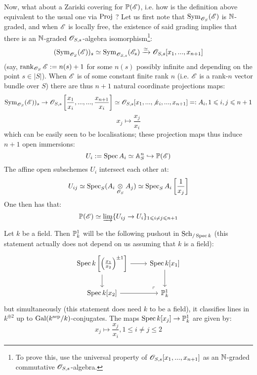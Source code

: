             Now, what about a Zariski covering for $\P(\scrE)$, i.e. how is the definition above equivalent to the usual one via $\Proj$ ? Let us first note that $\Sym_{\scrO_S}(\scrE)$ is $\N$-graded, and when $\scrE$ is locally free, the existence of said grading implies that there is an $\N$-graded $\scrO_{S, s}$-algebra isomorphism\footnote{To prove this, use the universal property of $\scrO_{S, s}[x_1, ..., x_{n + 1}]$ as an $\N$-graded commutative $\scrO_{S, s}$-algebra.}:
                $$(\Sym_{\scrO_S}(\scrE))_s \cong \Sym_{\scrO_{S, s}}(\scrE_s) \xrightarrow[]{\cong} \scrO_{S, s}[x_1, ..., x_{n + 1}]$$
            (say, $\rank_{\scrO_S} \scrE := n(s) + 1$ for some $n(s)$ possibly infinite and depending on the point $s \in |S|$). When $\scrE$ is of some constant finite rank $n$ (i.e. $\scrE$ is a rank-$n$ vector bundle over $S$) there are thus $n + 1$ natural coordinate projections maps:
                $$\Sym_{\scrO_S}(\scrE))_s \to \scrO_{S, s}\left[\frac{x_1}{x_i}, ..., ..., \frac{x_{n + 1}}{x_i}\right] \cong \scrO_{S, s}[x_1, ..., \not{x_i}, ..., x_{n + 1}] =: A_i, 1 \leq i, j \leq n + 1$$
                $$x_j \mapsto \frac{x_j}{x_i}$$
            which can be easily seen to be localisations; these projection maps thus induce $n + 1$ open immersions:
                $$U_i := \Spec A_i \cong \A^n_S \hookrightarrow \P(\scrE)$$
            The affine open subschemes $U_i$ intersect each other at:
                $$U_{ij} \cong \Spec_S ( A_i \tensor_{\scrO_S} A_j ) \cong \Spec_S A_i\left[\frac{1}{x_j}\right]$$
            One then has that:
                $$\P(\scrE) \cong \indlim\{U_{ij} \to U_i\}_{1 \leq i \not = j \leq n + 1}$$
            \begin{example}
                Let $k$ be a field. Then $\P^1_k$ will be the following pushout in $\Sch_{/\Spec k}$ (this statement actually does not depend on us assuming that $k$ is a field):
                    $$
                        \begin{tikzcd}
                    	{\Spec k\left[ \left( \frac{x_1}{x_2} \right)^{\pm 1} \right]} & {\Spec k[x_1]} \\
                    	{\Spec k[x_2]} & {\P^1_k}
                    	\arrow[from=1-1, to=2-1]
                    	\arrow[from=1-1, to=1-2]
                    	\arrow[from=1-2, to=2-2]
                    	\arrow[from=2-1, to=2-2]
                    	\arrow["\lrcorner"{anchor=center, pos=0.125, rotate=180}, draw=none, from=2-2, to=1-1]
                        \end{tikzcd}
                    $$
                but simultaneously (this statement does need $k$ to be a field), it classifies lines in $k^{\oplus 2}$ up to $\Gal(k^{\sep}/k)$-conjugates. The maps $\Spec k[x_j] \to \P^1_k$ are given by:
                    $$x_j \mapsto \frac{x_j}{x_i}, 1 \leq i \not = j \leq 2$$
            \end{example}
    
